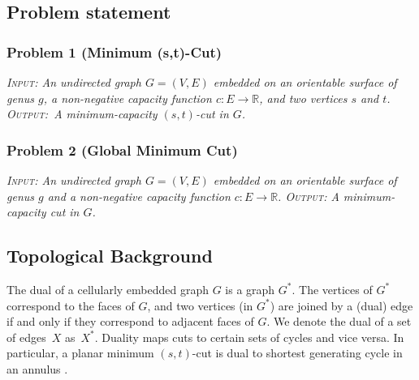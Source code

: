 \documentclass[natbib]{svcyclop}
\begin{document}
\subsection{Problem statement}

\subsubsection{Problem 1 (Minimum (s,t)-Cut)}
{\itshape
\textsc{Input}: An undirected graph $G = (V, E)$ embedded on an orientable surface of genus $g$, a non-negative capacity function $c\colon E \to \mathbb{R}$, and two vertices $s$ and $t$. \textsc{Output}:~A minimum-capacity $(s,t)$-cut in $G$.}


\subsubsection{Problem 2 (Global Minimum Cut)}
{\itshape
\textsc{Input}: An undirected graph $G = (V, E)$  embedded on an orientable surface of genus $g$ and a non-negative capacity function $c\colon E \to \mathbb{R}$.  \textsc{Output}: A minimum-capacity cut in $G$.}




\KeyRes

\subsection{Topological Background}


The dual of a cellularly embedded graph $G$ is a graph $G^*$.  The vertices of $G^*$ correspond to the faces of $G$, and two vertices (in $G^*$) are joined by a (dual) edge if and only if they correspond to adjacent faces of $G$.
We denote the dual of a set of edges~$X$ as~$X^*$.
Duality maps cuts to certain sets of cycles and vice versa.
In particular, a planar minimum $(s,t)$-cut is dual to shortest generating cycle in an annulus \cite{is-mfpn-79, r-mstcp-83}.
\end{document}
